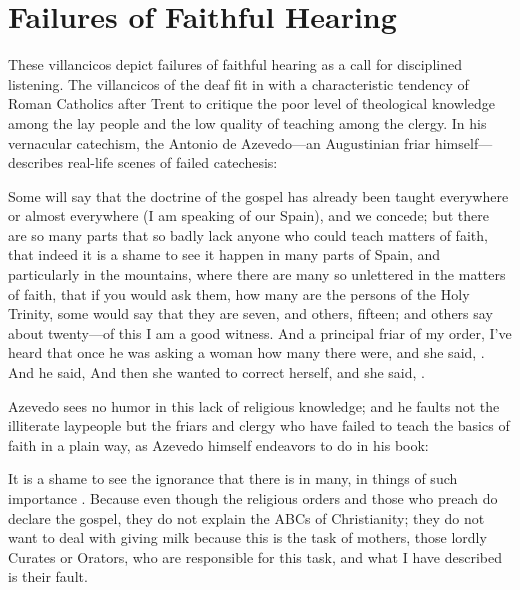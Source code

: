 
\section{Failures of Faithful Hearing}

These villancicos depict failures of faithful hearing as a call for disciplined
listening.
The villancicos of the deaf fit in with a characteristic tendency of Roman
Catholics after Trent to critique the poor level of theological knowledge among
the lay people and the low quality of teaching among the clergy.%
    \Autocite[56--57]{Kamen:EarlyModernSociety}
In his vernacular catechism, the Antonio de Azevedo---an Augustinian friar
himself--- describes real-life scenes of failed catechesis: 
\begin{quoting}
    Some will say that the doctrine of the gospel has already been taught
    everywhere or almost everywhere (I am speaking of our Spain), and we
    concede; but there are so many parts that so badly lack anyone who could
    teach matters of faith, that indeed it is a shame to see it happen in many
    parts of Spain, and particularly in the mountains, where there are many so
    unlettered  in the matters of faith, that if you would ask
    them, how many are the persons of the Holy Trinity, some would say that they
    are seven, and others, fifteen; and others say about twenty---of this I am a
    good witness.
    And a principal friar of my order, I've heard that once he was asking a
    woman how many  there were, and she said,
    . 
    And he said,  
    And then she wanted to correct herself, and she said, .%
        \Autocite[26]{Azevedo:Catecismo}
\end{quoting}
Azevedo sees no humor in this lack of religious knowledge; and he faults not the
illiterate laypeople but the friars and clergy who have failed to teach the
basics of faith in a plain way, as Azevedo himself endeavors to do in his book:
\begin{quoting}
    It is a shame to see the ignorance that there is in many, in things of such
    importance \Dots{}.
    Because even though the religious orders and those who preach do declare the
    gospel, they do not explain the ABCs  of Christianity;
    they do not want to deal with giving milk because this is the task of
    mothers, those lordly Curates or Orators, who are responsible for this task,
    and what I have described is their fault.%
        \Autocite[27]{Azevedo:Catecismo}
\end{quoting}
